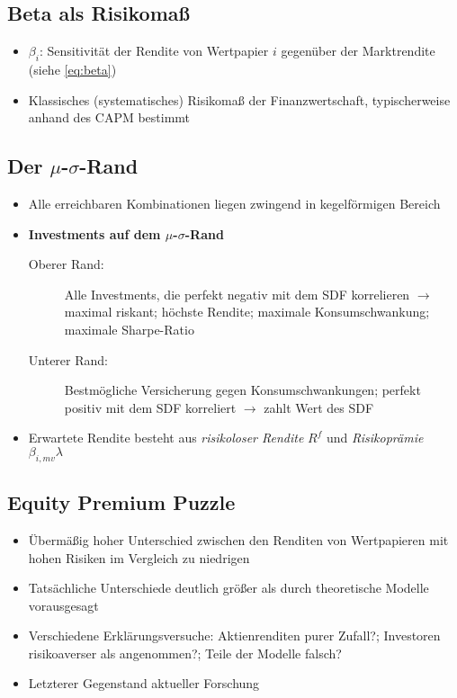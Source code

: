\subsection{Beta als Risikomaß}
\begin{itemize}
	\item \(\beta_i\): Sensitivität der Rendite von Wertpapier \(i\) gegenüber der Marktrendite (siehe \ref{eq:beta})
	\item Klassisches (systematisches) Risikomaß der Finanzwertschaft, typischerweise anhand des CAPM bestimmt
\end{itemize}


\subsection{Der \(\mu\)-\(\sigma\)-Rand}
\begin{itemize}
	\item Alle erreichbaren Kombinationen liegen zwingend in kegelförmigen Bereich
	\item \textbf{Investments auf dem \(\mu\)-\(\sigma\)-Rand}
	\begin{description}
		\item[Oberer Rand:] Alle Investments, die perfekt negativ mit dem SDF korrelieren \(\rightarrow\) maximal riskant; höchste Rendite; maximale Konsumschwankung; maximale Sharpe-Ratio
		\item[Unterer Rand:] Bestmögliche Versicherung gegen Konsumschwankungen; perfekt positiv mit dem SDF korreliert \(\rightarrow\) zahlt Wert des SDF
	\end{description}
	\item Erwartete Rendite besteht aus \textit{risikoloser Rendite} \(R^f\) und \textit{Risikoprämie} \(\beta_{i,mv}\lambda\)
\end{itemize}


\subsection{Equity Premium Puzzle}
\begin{itemize}
	\item Übermäßig hoher Unterschied zwischen den Renditen von Wertpapieren mit hohen Risiken im Vergleich zu niedrigen
	\item Tatsächliche Unterschiede deutlich größer als durch theoretische Modelle vorausgesagt
	\item Verschiedene Erklärungsversuche: Aktienrenditen purer Zufall?; Investoren risikoaverser als angenommen?; Teile der Modelle falsch?
	\item Letzterer Gegenstand aktueller Forschung
\end{itemize}



